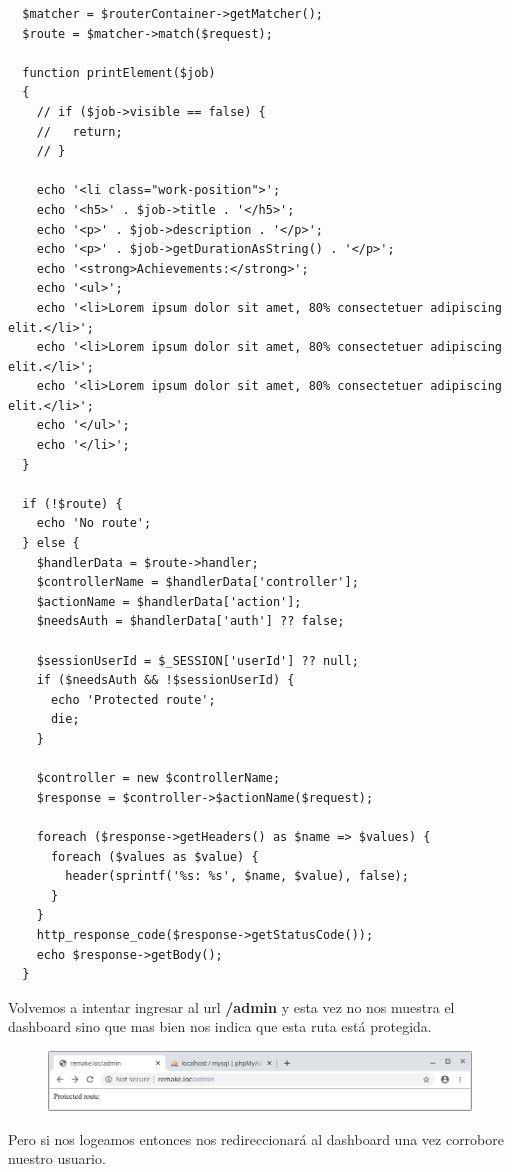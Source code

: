 \documentclass{article}
\begin{document}
\begin{verbatim}
  $matcher = $routerContainer->getMatcher();
  $route = $matcher->match($request);

  function printElement($job)
  {
    // if ($job->visible == false) {
    //   return;
    // }

    echo '<li class="work-position">';
    echo '<h5>' . $job->title . '</h5>';
    echo '<p>' . $job->description . '</p>';
    echo '<p>' . $job->getDurationAsString() . '</p>';
    echo '<strong>Achievements:</strong>';
    echo '<ul>';
    echo '<li>Lorem ipsum dolor sit amet, 80% consectetuer adipiscing elit.</li>';
    echo '<li>Lorem ipsum dolor sit amet, 80% consectetuer adipiscing elit.</li>';
    echo '<li>Lorem ipsum dolor sit amet, 80% consectetuer adipiscing elit.</li>';
    echo '</ul>';
    echo '</li>';
  }

  if (!$route) {
    echo 'No route';
  } else {
    $handlerData = $route->handler;
    $controllerName = $handlerData['controller'];
    $actionName = $handlerData['action'];
    $needsAuth = $handlerData['auth'] ?? false;

    $sessionUserId = $_SESSION['userId'] ?? null;
    if ($needsAuth && !$sessionUserId) {
      echo 'Protected route';
      die;
    }

    $controller = new $controllerName;
    $response = $controller->$actionName($request);

    foreach ($response->getHeaders() as $name => $values) {
      foreach ($values as $value) {
        header(sprintf('%s: %s', $name, $value), false);
      }
    }
    http_response_code($response->getStatusCode());
    echo $response->getBody();
  }
\end{verbatim}

Volvemos a intentar ingresar al url \textbf{/admin} y esta vez no nos muestra
el dashboard sino que mas bien nos indica que esta ruta está protegida.\\

\begin{figure}[h!]
  \centering
  \includegraphics[scale=0.5]{./Pictures/214_admin_protected.png}
\end{figure}

Pero si nos logeamos entonces nos redireccionará al dashboard una vez corrobore
nuestro usuario.\\
\end{document}
